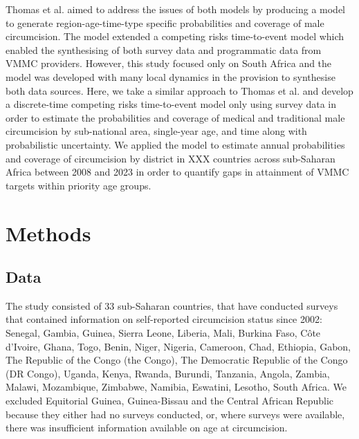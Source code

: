 \documentclass{article}
\begin{document}
Thomas et al. \cite{thomas2024substantial} aimed to address the issues of both models by producing a model to generate region-age-time-type specific probabilities and coverage of male circumcision. The model extended a competing risks time-to-event model which enabled the synthesising of both survey data and programmatic data from VMMC providers. However, this study focused only on South Africa and the model was developed with many local dynamics in the provision to synthesise both data sources. Here, we take a similar approach to Thomas et al. and develop a discrete-time competing risks time-to-event model only using survey data in order to estimate the probabilities and coverage of medical and traditional male circumcision by sub-national area, single-year age, and time along with probabilistic uncertainty. We applied the model to estimate annual probabilities and coverage of circumcision by district in XXX countries across sub-Saharan Africa between 2008 and 2023 in order to quantify gaps in attainment of VMMC targets within priority age groups. 

\newpage
\section{Methods}
\label{sec:orga131cc6}


\subsection{Data}
\label{sec:org020fc8c}


The study consisted of 33 sub-Saharan countries, that have conducted surveys that contained information on self-reported circumcision status since 2002: Senegal, Gambia, Guinea, Sierra Leone, Liberia, Mali, Burkina Faso, Côte d’Ivoire, Ghana, Togo, Benin, Niger, Nigeria, Cameroon, Chad, Ethiopia, Gabon, The Republic of the Congo (the Congo), The Democratic Republic of the Congo (DR Congo), Uganda, Kenya, Rwanda, Burundi, Tanzania, Angola, Zambia, Malawi, Mozambique, Zimbabwe, Namibia, Eswatini, Lesotho, South Africa. 
We excluded Equitorial Guinea, Guinea-Bissau and the Central African Republic because they either had no surveys conducted, or, where surveys were available, there was insufficient information available on age at circumcision.
\end{document}
